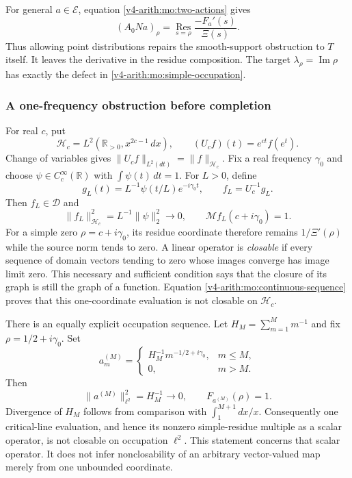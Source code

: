 For general $a\in\mathscr E$, equation \eqref{v4-arith:mo:two-actions} gives
\[
 (A_0Na)_\rho=\operatorname*{Res}_{s=\rho}
                      \frac{-F_a'(s)}{\Xi(s)}.
\]
Thus allowing point distributions repairs the smooth-support
obstruction to $T$ itself. It leaves the derivative in the residue
composition. The target $\lambda_\rho=\operatorname{Im}\rho$ has
exactly the defect in \eqref{v4-arith:mo:simple-occupation}.

\subsubsection{A one-frequency obstruction before completion}

For real $c$, put
\[
 \mathscr H_c=L^2(\mathbb R_{>0},x^{2c-1}\,dx),\qquad
 (U_cf)(t)=e^{ct}f(e^t).
\]
Change of variables gives $\|U_cf\|_{L^2(dt)}=\|f\|_{\mathscr H_c}$.
Fix a real frequency $\gamma_0$ and choose
$\psi\in C_c^\infty(\mathbb R)$ with $\int\psi(t)\,dt=1$.
For $L>0$, define
\[
 g_L(t)=L^{-1}\psi(t/L)e^{-i\gamma_0t},\qquad f_L=U_c^{-1}g_L.
\]
Then $f_L\in\mathscr D$ and
\begin{equation}
 \|f_L\|_{\mathscr H_c}^2=L^{-1}\|\psi\|_2^2\longrightarrow0,
 \qquad \mathcal Mf_L(c+i\gamma_0)=1.
 \label{v4-arith:mo:continuous-sequence}
\end{equation}
For a simple zero $\rho=c+i\gamma_0$, its residue coordinate
therefore remains $1/\Xi'(\rho)$ while the source norm tends to zero.
A linear operator is \emph{closable} if every sequence of domain
vectors tending to zero whose images converge has image limit zero.
This necessary and sufficient condition says that the closure of
its graph is still the graph of a function. Equation
\eqref{v4-arith:mo:continuous-sequence} proves that this one-coordinate
evaluation is not closable on $\mathscr H_c$.

There is an equally explicit occupation sequence. Let
$H_M=\sum_{m=1}^M m^{-1}$ and fix $\rho=1/2+i\gamma_0$. Set
\[
 a_m^{(M)}=
 \begin{cases}H_M^{-1}m^{-1/2+i\gamma_0},&m\leq M,\\0,&m>M.
 \end{cases}
\]
Then
\begin{equation}
 \|a^{(M)}\|_{\ell^2}^2=H_M^{-1}\longrightarrow0,
 \qquad F_{a^{(M)}}(\rho)=1.
 \label{v4-arith:mo:atomic-sequence}
\end{equation}
Divergence of $H_M$ follows from comparison with $\int_1^{M+1}dx/x$.
Consequently one critical-line evaluation, and hence its nonzero
simple-residue multiple as a scalar operator, is not closable on
occupation $\ell^2$. This statement concerns that scalar operator.
It does not infer nonclosability of an arbitrary vector-valued
map merely from one unbounded coordinate.

